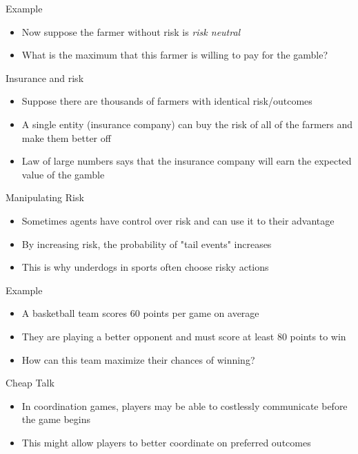 \documentclass[10pt]{beamer}
\begin{document}
\begin{frame}[label={sec:org7b4eed0}]{}
\alert{Example}
\begin{itemize}
\item Now suppose the farmer without risk is \emph{risk neutral}
\item What is the maximum that this farmer is willing to pay for the gamble?
\end{itemize}
\end{frame}

\begin{frame}[label={sec:org5d92c5a}]{}
\alert{Insurance and risk}
\begin{itemize}
\item Suppose there are thousands of farmers with identical risk/outcomes
\item A single entity (insurance company) can buy the risk of all of the farmers and make them better off
\item Law of large numbers says that the insurance company will earn the expected value of the gamble
\end{itemize}
\end{frame}

\begin{frame}[label={sec:org55ba178}]{}
\alert{Manipulating Risk}
\begin{itemize}
\item Sometimes agents have control over risk and can use it to their advantage
\item By increasing risk, the probability of "tail events" increases
\item This is why underdogs in sports often choose risky actions
\end{itemize}
\end{frame}

\begin{frame}[label={sec:org99e9ed5}]{}
\alert{Example}
\begin{itemize}
\item A basketball team scores 60 points per game on average
\item They are playing a better opponent and must score at least 80 points to win
\item How can this team maximize their chances of winning?
\end{itemize}
\end{frame}

\begin{frame}[label={sec:orged3689b}]{}
\alert{Cheap Talk}
\begin{itemize}
\item In coordination games, players may be able to costlessly communicate before the game begins
\item This might allow players to better coordinate on preferred outcomes
\end{itemize}
\end{frame}
\end{document}
